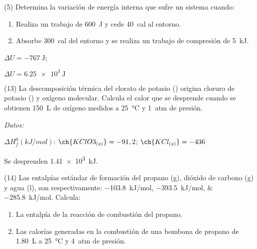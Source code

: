 \documentclass[10pt]{article}
\newenvironment{gexdatos}{
      \vspace{2pt}\noindent\textit{Datos: }
    }{\vspace{5pt}}
\begin{document}
\begin{multicols}{2}


\begin{exercise}[
    tags    = {},
    topics  = {química, termodinámica, termoquímica},
    source  = {FQ 1B MGH 2016, p159, e5},
  ]
  (5) Determina la variación de energía interna que sufre un sistema
  cuando:
  \begin{enumerate}
    \item Realiza un trabajo de \SI{600}{\joule} y cede \SI{40}{cal} al entorno.
    \item Absorbe \SI{300}{cal} del entorno y se realiza un trabajo de compresión de \SI{5}{\kilo\joule}.
  \end{enumerate}
\end{exercise}

\begin{solution}
  \begin{enumerate*}
    \item \( \Delta U = \SI{-767}{\joule} \); \item \( \Delta U = \SI{6.25e3}{\joule} \)
  \end{enumerate*}
\end{solution}




\begin{exercise}[
    tags    = {},
    topics  = {química, termodinámica, termoquímica},
    source  = {FQ 1B MGH 2016, p165, e13},
  ]
  (13) La descomposición térmica del clorato de potasio ()
  origina cloruro de potasio () y oxígeno molecular. Calcula
  el calor que se desprende cuando se obtienen \SI{150}{\liter} de
  oxígeno medidos a \SI{25}{\celsius} y \SI{1}{atm} de presión.

  \begin{gexdatos}
    \( \Delta H^0_f (\si{kJ/mol}) \): \( \ch{KClO3_{(s)}} = -91,2 \); \( \ch{KCl_{(s)}} = -436 \)
  \end{gexdatos}
\end{exercise}

\begin{solution}
  Se desprenden \SI{1.41e3}{kJ}.
\end{solution}




\begin{exercise}[
    tags    = {},
    topics  = {química, termodinámica, termoquímica},
    source  = {FQ 1B MGH 2016, p165, e6},
  ]
  (14) Las entalpías estándar de formación del propano (g),
  dióxido de carbono (g) y agua (l), son respectivamente:
  \SIlist{-103,8;-393,5;-285,8}{kJ/mol}. Calcula:
  \begin{enumerate}
    \item La entalpía de la reacción de combustión del propano.
    \item Las calorías generadas en la combustión de una bombona de propano de \SI{1.80}{\liter} a \SI{25}{\celsius} y \SI{4}{atm} de presión.
  \end{enumerate}
\end{exercise}


\end{multicols}
\end{document}
